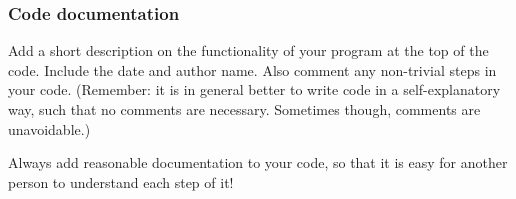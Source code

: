\subsubsection{Code documentation}
Add a short description on the functionality of your program at the top of the code. Include the date and author name. Also comment any non-trivial steps in your code. (Remember: it is in general better to write code in a self-explanatory way, such that no comments are necessary. Sometimes though, comments are unavoidable.)
%
\begin{task}
  Always add reasonable documentation to your code, so that it is easy for another person to understand each step of it!
\end{task}
%

